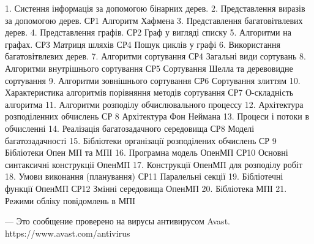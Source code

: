 

1. Систення інформація за допомогою бінарних дерев.
2. Представлення виразів за допомогою дерев. СР1 Алгоритм Хафмена
3. Представлення багатовітвлевих дерев.
4. Представлення графів. СР2 Граф у вигляді списку
5. Алгоритми на графах. СР3 Матриця шляхів СР4 Пошук циклів у графі
6. Використання багатовітвлевих дерев. 
7. Алгоритми сортування СР4 Загальні види сортувань
8. Алгоритми внутрішнього сортування СР5 Сортування Шелла та  деревовидне сортування
9. Алгоритми зовнішнього сортування СР6 Сортування злиттям
10. Характеристика алгоритмів порівняння методів сортування СР7 О-складність алгоритма
11. Алгоритми розподілу обчислювального процессу
12. Архітектура розподіленних обчислень СР 8 Архітектура Фон Неймана
13. Процеси і потоки в обчисленні
14. Реалізація багатозадачного середовища СР8 Моделі багатозадачності
15. Бібліотеки організації розподілених обчислень СР 9 Бібліотеки Опен МП та МПІ
16. Програмна модель ОпенМП СР10 Основні синтаксичні конструкції ОпенМП 
17. Конструкції ОпенМП  для розподілу робіт
18. Умови виконання (планування) СР11 Паралельні секції
19. Бібліотечні функції ОпенМП  СР12 Змінні середовища ОпенМП 
20. Бібліотека МПІ
21. Режими обліку повідомлень в МПІ


---
Это сообщение проверено на вирусы антивирусом Avast.
https://www.avast.com/antivirus

